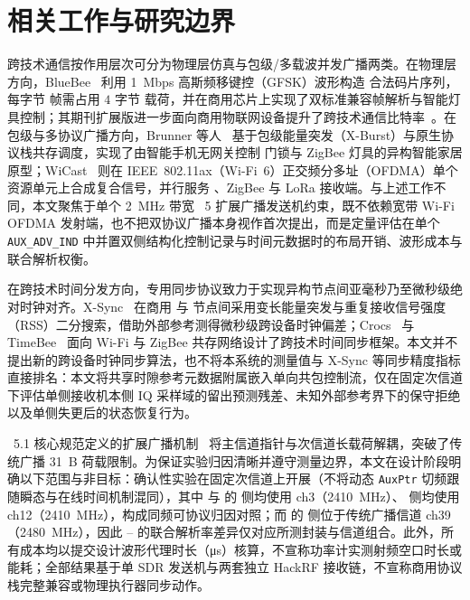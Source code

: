 \section{相关工作与研究边界}\label{sec:related}

跨技术通信按作用层次可分为物理层仿真与包级/多载波并发广播两类。在物理层方向，BlueBee~\cite{jiang2017bluebee} 利用 \SI{1}{Mbps} \ble{} 高斯频移键控（GFSK）波形构造 \stdfour{} 合法码片序列，每字节 \stdfour{} 帧需占用 $4$ 字节 \ble{} 载荷，并在商用芯片上实现了双标准兼容帧解析与智能灯具控制；其期刊扩展版进一步面向商用物联网设备提升了跨技术通信比特率~\cite{jiang2019boosting}。在包级与多协议广播方向，Brunner 等人~\cite{brunner2021leveraging} 基于包级能量突发（X-Burst）与原生协议栈共存调度，实现了由智能手机无网关控制 \ble{} 门锁与 ZigBee 灯具的异构智能家居原型；WiCast~\cite{xia2025wicast} 则在 IEEE~802.11ax（Wi-Fi~6）正交频分多址（OFDMA）单个资源单元上合成复合信号，并行服务 \ble{}、ZigBee 与 LoRa 接收端。与上述工作不同，本文聚焦于单个 \SI{2}{MHz} 带宽 \ble{}~5 扩展广播发送机约束，既不依赖宽带 Wi-Fi OFDMA 发射端，也不把双协议广播本身视作首次提出，而是定量评估在单个 \texttt{AUX\_ADV\_IND} 中并置双侧结构化控制记录与时间元数据时的布局开销、波形成本与联合解析权衡。

在跨技术时间分发方向，专用同步协议致力于实现异构节点间亚毫秒乃至微秒级绝对时钟对齐。X-Sync~\cite{hofmann2021xsync} 在商用 \ble{} 与 \stdfour{} 节点间采用变长能量突发与重复接收信号强度（RSS）二分搜索，借助外部参考测得微秒级跨设备时钟偏差；Crocs~\cite{yu2018crocs} 与 TimeBee~\cite{gao2023timebee} 面向 Wi-Fi 与 ZigBee 共存网络设计了跨技术时间同步框架。本文并不提出新的跨设备时钟同步算法，也不将本系统的测量值与 X-Sync 等同步精度指标直接排名：本文将共享时隙参考元数据附属嵌入单向共包控制流，仅在固定次信道下评估单侧接收机本侧 IQ 采样域的留出预测残差、未知外部参考界下的保守拒绝以及单侧失更后的状态恢复行为。

\ble{}~5.1 核心规范定义的扩展广播机制~\cite{bluetooth_core51} 将主信道指针与次信道长载荷解耦，突破了传统广播 \SI{31}{B} 荷载限制。为保证实验归因清晰并遵守测量边界，本文在设计阶段明确以下范围与非目标：确认性实验在固定次信道上开展（不将动态 \texttt{AuxPtr} 切频跟随瞬态与在线时间机制混同），其中 \modejc{} 与 \modesc{} 的 \ble{} 侧均使用 ch3（\SI{2410}{MHz}）、\stdfour{} 侧均使用 ch12（\SI{2410}{MHz}），构成同频可协议归因对照；而 \modelc{} 的 \ble{} 侧位于传统广播信道 ch39（\SI{2480}{MHz}），因此 \modejc{}--\modelc{} 的联合解析率差异仅对应所测封装与信道组合。此外，所有成本均以提交设计波形代理时长（\si{\micro\second}）核算，不宣称功率计实测射频空口时长或能耗；全部结果基于单 SDR 发送机与两套独立 HackRF 接收链，不宣称商用协议栈完整兼容或物理执行器同步动作。
